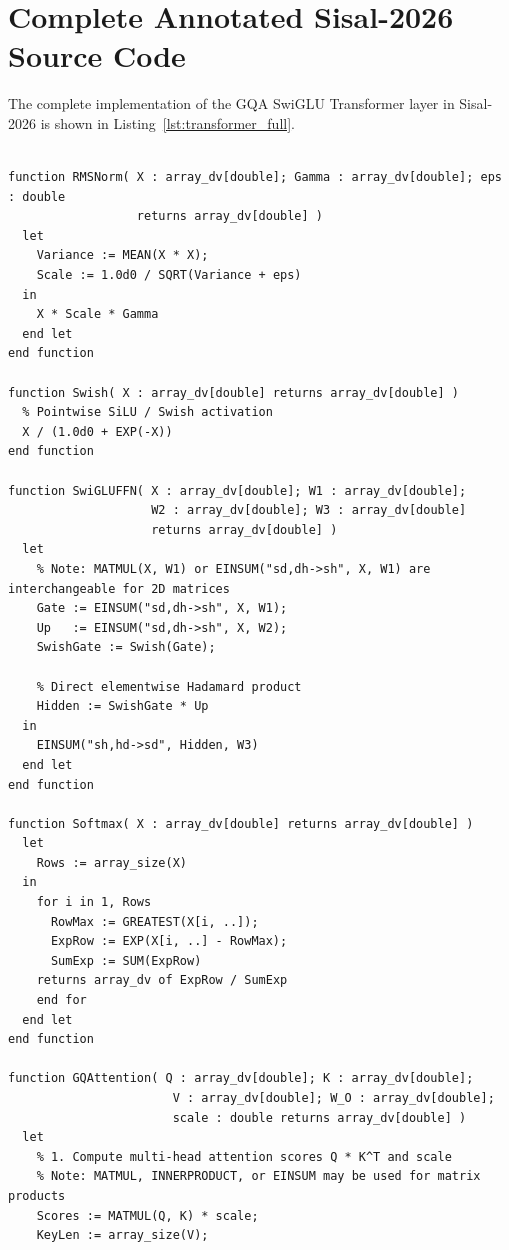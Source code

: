 \section{Complete Annotated Sisal-2026 Source Code}
\label{sec:transformer_code}

The complete implementation of the GQA SwiGLU Transformer layer in Sisal-2026 is shown in Listing~\ref{lst:transformer_full}.

\begin{lstlisting}[language=Sisal, caption={Sisal-2026 Transformer Block Implementation (\texttt{transformer\_gqa\_swiglu.sis}).}, label={lst:transformer_full}]
% Sisal-2026 Modern Transformer Layer (RMSNorm, GQA, SwiGLU, Residuals)

function RMSNorm( X : array_dv[double]; Gamma : array_dv[double]; eps : double 
                  returns array_dv[double] )
  let
    Variance := MEAN(X * X);
    Scale := 1.0d0 / SQRT(Variance + eps)
  in
    X * Scale * Gamma
  end let
end function

function Swish( X : array_dv[double] returns array_dv[double] )
  % Pointwise SiLU / Swish activation
  X / (1.0d0 + EXP(-X))
end function

function SwiGLUFFN( X : array_dv[double]; W1 : array_dv[double]; 
                    W2 : array_dv[double]; W3 : array_dv[double] 
                    returns array_dv[double] )
  let
    % Note: MATMUL(X, W1) or EINSUM("sd,dh->sh", X, W1) are interchangeable for 2D matrices
    Gate := EINSUM("sd,dh->sh", X, W1);
    Up   := EINSUM("sd,dh->sh", X, W2);
    SwishGate := Swish(Gate);
    
    % Direct elementwise Hadamard product
    Hidden := SwishGate * Up
  in
    EINSUM("sh,hd->sd", Hidden, W3)
  end let
end function

function Softmax( X : array_dv[double] returns array_dv[double] )
  let
    Rows := array_size(X)
  in
    for i in 1, Rows
      RowMax := GREATEST(X[i, ..]);
      ExpRow := EXP(X[i, ..] - RowMax);
      SumExp := SUM(ExpRow)
    returns array_dv of ExpRow / SumExp
    end for
  end let
end function

function GQAttention( Q : array_dv[double]; K : array_dv[double]; 
                       V : array_dv[double]; W_O : array_dv[double]; 
                       scale : double returns array_dv[double] )
  let
    % 1. Compute multi-head attention scores Q * K^T and scale
    % Note: MATMUL, INNERPRODUCT, or EINSUM may be used for matrix products
    Scores := MATMUL(Q, K) * scale;
    KeyLen := array_size(V);
    

\end{lstlisting}
